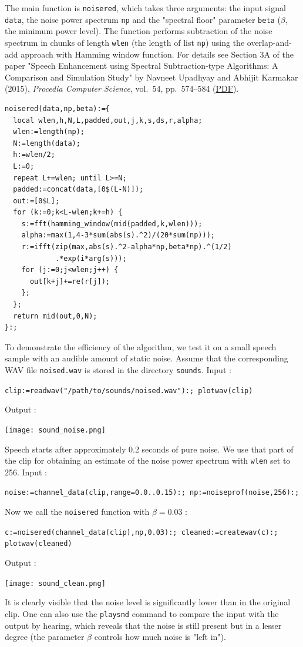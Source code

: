 \documentclass[a4paper,11pt]{book}
\begin{document}
The main function is {\tt noisered}, which takes three arguments: the input signal {\tt data}, the noise power spectrum {\tt np} and the "spectral floor" parameter {\tt beta} ($\beta$, the minimum power level). The function performs subtraction of the noise spectrum in chunks of length {\tt wlen} (the length of list {\tt np}) using the overlap-and-add approach with Hamming window function. For details see Section 3A of the paper "Speech Enhancement using Spectral Subtraction-type Algorithms: A Comparison and Simulation Study" by Navneet Upadhyay and Abhijit Karmakar (2015), \emph{Procedia Computer Science}, vol.~54, pp.~574--584 (\href{https://core.ac.uk/download/pdf/81218023.pdf}{PDF}).
\begin{verbatim}
noisered(data,np,beta):={
  local wlen,h,N,L,padded,out,j,k,s,ds,r,alpha;
  wlen:=length(np);
  N:=length(data);
  h:=wlen/2;
  L:=0;
  repeat L+=wlen; until L>=N;
  padded:=concat(data,[0$(L-N)]);
  out:=[0$L];
  for (k:=0;k<L-wlen;k+=h) {
    s:=fft(hamming_window(mid(padded,k,wlen)));
    alpha:=max(1,4-3*sum(abs(s).^2)/(20*sum(np)));
    r:=ifft(zip(max,abs(s).^2-alpha*np,beta*np).^(1/2)
            .*exp(i*arg(s)));
    for (j:=0;j<wlen;j++) {
      out[k+j]+=re(r[j]);
    };
  };
  return mid(out,0,N);
}:;
\end{verbatim}

To demonstrate the efficiency of the algorithm, we test it on a small speech sample with an audible amount of static noise. Assume that the corresponding WAV file {\tt noised.wav} is stored in the directory {\tt sounds}. Input :
\begin{center}
  \tt clip:=readwav("/path/to/sounds/noised.wav"):; plotwav(clip)
\end{center}
Output :
\begin{center}
  \texttt{[image: sound\_noise.png]}
\end{center}
Speech starts after approximately 0.2 seconds of pure noise. We use that part of the clip for obtaining an estimate of the noise power spectrum with {\tt wlen} set to 256. Input :
\begin{center}
  \tt noise:=channel\_data(clip,range=0.0..0.15):; np:=noiseprof(noise,256):;
\end{center}
Now we call the {\tt noisered} function with $\beta=0.03$ :
\begin{center}
  \tt c:=noisered(channel\_data(clip),np,0.03):; cleaned:=createwav(c):; plotwav(cleaned)
\end{center}
Output :
\begin{center}
  \texttt{[image: sound\_clean.png]}
\end{center}
It is clearly visible that the noise level is significantly lower than in the original clip. One can also use the {\tt playsnd} command to compare the input with the output by hearing, which reveals that the noise is still present but in a lesser degree (the parameter $\beta$ controls how much noise is "left in").
\end{document}
